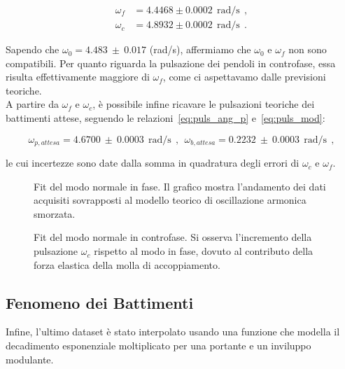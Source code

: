 \documentclass[a4paper,12pt]{article}
\begin{document}
\begin{align*}
    \omega_f &= 4.4468 \pm 0.0002 \ \ \text{rad/s} \ \ ,\\ 
    \omega_c &= 4.8932 \pm 0.0002 \ \ \text{rad/s} \ \ .
\end{align*}

Sapendo che $\omega_0 = 4.483 \ \pm \ 0.017$ (rad/s), affermiamo che $\omega_0$ e $\omega_f$ non sono compatibili.
Per quanto riguarda la pulsazione dei pendoli in controfase, essa risulta effettivamente maggiore di $\omega_f$, come ci aspettavamo dalle previsioni teoriche.
\\
A partire da $\omega_f$ e $\omega_c$, è possibile infine ricavare le pulsazioni teoriche dei battimenti attese, seguendo le relazioni~\ref{eq:puls_ang_p} e~\ref{eq:puls_mod}:

\[
    \omega_{p, attesa} = 4.6700 \ \pm \ 0.0003 \ \ \text{rad/s}\ \ , \ \ \omega_{b, attesa} = 0.2232 \ \pm \ 0.0003 \ \ \text{rad/s}\ \ ,
\]

le cui incertezze sono date dalla somma in quadratura degli errori di $\omega_c$ e $\omega_f$.

\begin{figure}
    \centering
    \resizebox{0.95\textwidth}{!}{%
        
    }
    \caption{Fit del modo normale in fase. Il grafico mostra l'andamento dei dati acquisiti sovrapposti al modello teorico di oscillazione armonica smorzata.}%
    \label{fig:Figura2}
\end{figure}

\begin{figure}
    \centering
    \resizebox{0.95\textwidth}{!}{%
        
    }
    \caption{Fit del modo normale in controfase. Si osserva l'incremento della pulsazione $\omega_c$ rispetto al modo in fase, dovuto al contributo della forza elastica della molla di accoppiamento.}%
    \label{fig:Figura3}
\end{figure}

\subsection{Fenomeno dei Battimenti}

Infine, l'ultimo dataset è stato interpolato usando una funzione che modella il decadimento esponenziale moltiplicato per una portante e un inviluppo modulante. \\
\end{document}
